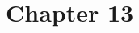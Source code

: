 \newpage
\section{Chapter 13}

\begin{problem} \notfinish
\end{problem}

\begin{problem} \notfinish
\end{problem}

\begin{problem} \notfinish
\end{problem}

\begin{problem} \notfinish
\end{problem}

\begin{problem} \notfinish
\end{problem}